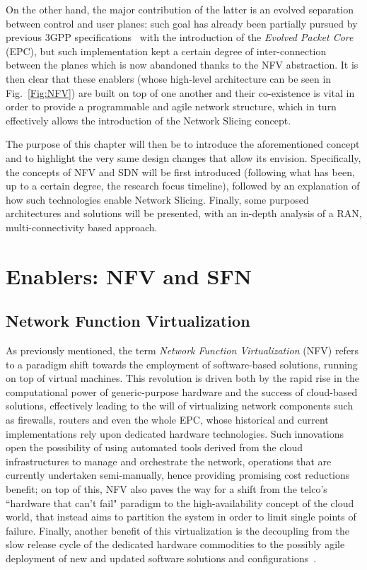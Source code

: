 \documentclass[11pt]{book}
\begin{document}
On the other hand, the major contribution of the latter is an evolved separation between control and user planes: such goal has already been partially pursued by previous 3GPP specifications~\cite{3gpp_LTE} with the introduction of the \textit{Evolved Packet Core} (EPC), but such implementation kept a certain degree of inter-connection between the planes which is now abandoned thanks to the NFV abstraction. It is then clear that these enablers (whose high-level architecture can be seen in Fig.~\ref{Fig:NFV}) are built on top of one another and their co-existence is vital in order to provide a programmable and agile network structure, which in turn effectively allows the introduction of the Network Slicing concept. 

The purpose of this chapter will then be to introduce the aforementioned concept and to highlight the very same design changes that allow its envision. Specifically, the concepts of NFV and SDN will be first introduced (following what has been, up to a certain degree, the research focus timeline), followed by an explanation of how such technologies enable Network Slicing. Finally, some purposed architectures and solutions will be presented, with an in-depth analysis of a RAN, multi-connectivity based approach.

\section{Enablers: NFV and SFN}
\subsection{Network Function Virtualization}
As previously mentioned, the term \textit{Network Function Virtualization} (NFV) refers to a paradigm shift towards the employment of software-based solutions, running on top of virtual machines. This revolution is driven both by the rapid rise in the computational power of generic-purpose hardware and the success of cloud-based solutions, effectively leading to the will of virtualizing network components such as firewalls, routers and even the whole EPC, whose historical and current implementations rely upon dedicated hardware technologies. Such innovations open the possibility of using automated tools derived from the cloud infrastructures to manage and orchestrate the network, operations that are currently undertaken semi-manually, hence providing promising cost reductions benefit; on top of this, NFV also paves the way for a shift from the telco's ``hardware that can't fail" paradigm to the high-availability concept of the cloud world, that instead aims to partition the system in order to limit single points of failure. Finally, another benefit of this virtualization is the decoupling from the slow release cycle of the dedicated hardware commodities to the possibly agile deployment of new and updated software solutions and configurations~\cite{yousaf2017nfv}.
\end{document}
